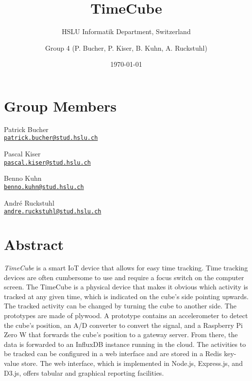 \author{Group 4 (P. Bucher, P. Kiser, B. Kuhn, A. Ruckstuhl)}
\title{TimeCube}
\subtitle{HSLU Informatik Department, Switzerland}
\date{\today}
\maketitle

\section*{Group Members}

\begin{multicols}{2}
\noindent
    Patrick Bucher\\ \href{mailto:patrick.bucher@stud.hslu.ch}{\texttt{patrick.bucher@stud.hslu.ch}}

\noindent
    Pascal Kiser\\ \href{mailto:pascal.kiser@stud.hslu.ch}{\texttt{pascal.kiser@stud.hslu.ch}}

\noindent
    Benno Kuhn\\ \href{mailto:benno.kuhn@stud.hslu.ch}{\texttt{benno.kuhn@stud.hslu.ch}}

\noindent
    André Ruckstuhl\\ \href{mailto:andre.ruckstuhl@stud.hslu.ch}{\texttt{andre.ruckstuhl@stud.hslu.ch}}
\end{multicols}

\tableofcontents

\section{Abstract}

\textit{TimeCube} is a smart IoT device that allows for easy time tracking. Time tracking devices are often cumbersome to use and require a focus switch on the computer screen. The TimeCube is a physical device that makes it obvious which activity is tracked at any given time, which is indicated on the cube's side pointing upwards. The tracked activity can be changed by turning the cube to another side. The prototypes are made of plywood. A prototype contains an accelerometer to detect the cube's position, an A/D converter to convert the signal, and a Raspberry Pi Zero W that forwards the cube's position to a gateway server. From there, the data is forwarded to an InfluxDB instance running in the cloud. The activities to be tracked can be configured in a web interface and are stored in a Redis key-value store. The web interface, which is implemented in Node.js, Express.js, and D3.js, offers tabular and graphical reporting facilities.
